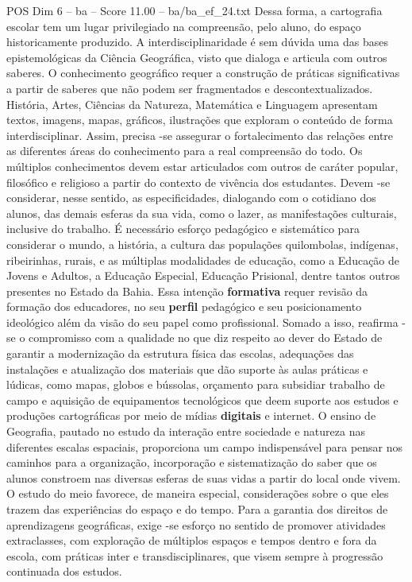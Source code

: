 \begin{textsample}{POS Dim 6 – ba – Score 11.00 – ba/ba\_ef\_24.txt}
Dessa forma, a cartografia escolar tem um lugar privilegiado na compreensão, pelo aluno, do espaço historicamente produzido.
A interdisciplinaridade é sem dúvida uma das bases epistemológicas da Ciência Geográfica, visto que dialoga e articula com outros saberes.
O conhecimento geográfico requer a construção de práticas significativas a partir de saberes que não podem ser fragmentados e descontextualizados.
História, Artes, Ciências da Natureza, Matemática e Linguagem apresentam textos, imagens, mapas, gráficos, ilustrações que exploram o conteúdo de forma interdisciplinar.
Assim, precisa -se assegurar o fortalecimento das relações entre as diferentes áreas do conhecimento para a real compreensão do todo.
Os múltiplos conhecimentos devem estar articulados com outros de caráter popular, filosófico e religioso a partir do contexto de vivência dos estudantes.
Devem -se considerar, nesse sentido, as especificidades, dialogando com o cotidiano dos alunos, das demais esferas da sua vida, como o lazer, as manifestações culturais, inclusive do trabalho.
É necessário esforço pedagógico e sistemático para considerar o mundo, a história, a cultura das populações quilombolas, indígenas, ribeirinhas, rurais, e as múltiplas modalidades de educação, como a Educação de Jovens e Adultos, a Educação Especial, Educação Prisional, dentre tantos outros presentes no Estado da Bahia.
Essa intenção \textbf{formativa} requer revisão da formação dos educadores, no seu \textbf{perfil} pedagógico e seu posicionamento ideológico além da visão do seu papel como profissional.
Somado a isso, reafirma -se o compromisso com a qualidade no que diz respeito ao dever do Estado de garantir a modernização da estrutura física das escolas, adequações das instalações e atualização dos materiais que dão suporte às aulas práticas e lúdicas, como mapas, globos e bússolas, orçamento para subsidiar trabalho de campo e aquisição de equipamentos tecnológicos que deem suporte aos estudos e produções cartográficas por meio de mídias \textbf{digitais} e internet.
O ensino de Geografia, pautado no estudo da interação entre sociedade e natureza nas diferentes escalas espaciais, proporciona um campo indispensável para pensar nos caminhos para a organização, incorporação e sistematização do saber que os alunos constroem nas diversas esferas de suas vidas a partir do local onde vivem.
O estudo do meio favorece, de maneira especial, considerações sobre o que eles trazem das experiências do espaço e do tempo.
Para a garantia dos direitos de aprendizagens geográficas, exige -se esforço no sentido de promover atividades extraclasses, com exploração de múltiplos espaços e tempos dentro e fora da escola, com práticas inter e transdisciplinares, que visem sempre à progressão continuada dos estudos.

\end{textsample}
